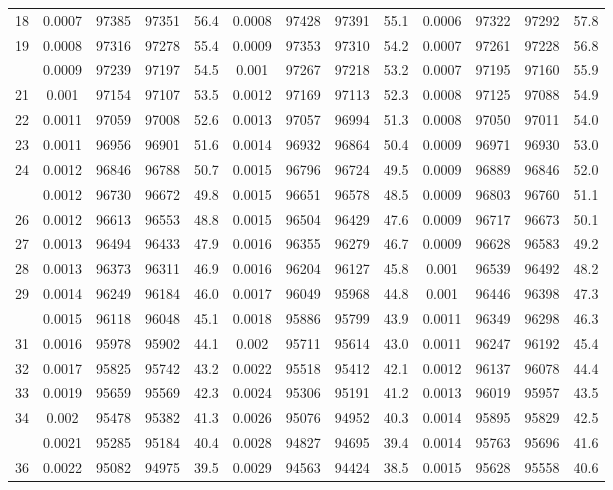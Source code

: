\documentclass[
  14pt,
]{article}
\begin{document}
\begin{longtable}[t]{lcccccccccccc}
18 & 0.0007 & 97385 & 97351 & 56.4 & 0.0008 & 97428 & 97391 & 55.1 & 0.0006 & 97322 & 97292 & 57.8\\
19 & 0.0008 & 97316 & 97278 & 55.4 & 0.0009 & 97353 & 97310 & 54.2 & 0.0007 & 97261 & 97228 & 56.8\\
\addlinespace
20 & 0.0009 & 97239 & 97197 & 54.5 & 0.001 & 97267 & 97218 & 53.2 & 0.0007 & 97195 & 97160 & 55.9\\
21 & 0.001 & 97154 & 97107 & 53.5 & 0.0012 & 97169 & 97113 & 52.3 & 0.0008 & 97125 & 97088 & 54.9\\
22 & 0.0011 & 97059 & 97008 & 52.6 & 0.0013 & 97057 & 96994 & 51.3 & 0.0008 & 97050 & 97011 & 54.0\\
23 & 0.0011 & 96956 & 96901 & 51.6 & 0.0014 & 96932 & 96864 & 50.4 & 0.0009 & 96971 & 96930 & 53.0\\
24 & 0.0012 & 96846 & 96788 & 50.7 & 0.0015 & 96796 & 96724 & 49.5 & 0.0009 & 96889 & 96846 & 52.0\\
\addlinespace
25 & 0.0012 & 96730 & 96672 & 49.8 & 0.0015 & 96651 & 96578 & 48.5 & 0.0009 & 96803 & 96760 & 51.1\\
26 & 0.0012 & 96613 & 96553 & 48.8 & 0.0015 & 96504 & 96429 & 47.6 & 0.0009 & 96717 & 96673 & 50.1\\
27 & 0.0013 & 96494 & 96433 & 47.9 & 0.0016 & 96355 & 96279 & 46.7 & 0.0009 & 96628 & 96583 & 49.2\\
28 & 0.0013 & 96373 & 96311 & 46.9 & 0.0016 & 96204 & 96127 & 45.8 & 0.001 & 96539 & 96492 & 48.2\\
29 & 0.0014 & 96249 & 96184 & 46.0 & 0.0017 & 96049 & 95968 & 44.8 & 0.001 & 96446 & 96398 & 47.3\\
\addlinespace
30 & 0.0015 & 96118 & 96048 & 45.1 & 0.0018 & 95886 & 95799 & 43.9 & 0.0011 & 96349 & 96298 & 46.3\\
31 & 0.0016 & 95978 & 95902 & 44.1 & 0.002 & 95711 & 95614 & 43.0 & 0.0011 & 96247 & 96192 & 45.4\\
32 & 0.0017 & 95825 & 95742 & 43.2 & 0.0022 & 95518 & 95412 & 42.1 & 0.0012 & 96137 & 96078 & 44.4\\
33 & 0.0019 & 95659 & 95569 & 42.3 & 0.0024 & 95306 & 95191 & 41.2 & 0.0013 & 96019 & 95957 & 43.5\\
34 & 0.002 & 95478 & 95382 & 41.3 & 0.0026 & 95076 & 94952 & 40.3 & 0.0014 & 95895 & 95829 & 42.5\\
\addlinespace
35 & 0.0021 & 95285 & 95184 & 40.4 & 0.0028 & 94827 & 94695 & 39.4 & 0.0014 & 95763 & 95696 & 41.6\\
36 & 0.0022 & 95082 & 94975 & 39.5 & 0.0029 & 94563 & 94424 & 38.5 & 0.0015 & 95628 & 95558 & 40.6\\

\end{longtable}
\end{document}
